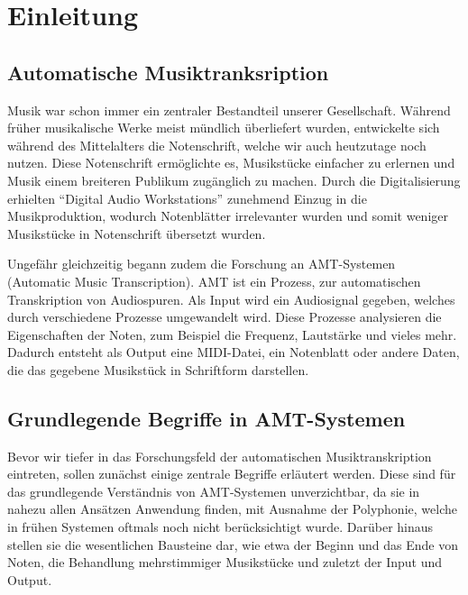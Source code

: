 \section{Einleitung}
\subsection{Automatische Musiktranksription}
Musik war schon immer ein zentraler Bestandteil unserer Gesellschaft.
Während früher musikalische Werke meist mündlich überliefert wurden,
entwickelte sich während des Mittelalters die Notenschrift, welche wir auch heutzutage noch nutzen.
Diese Notenschrift ermöglichte es, Musikstücke einfacher zu erlernen und Musik einem breiteren Publikum zugänglich zu machen.
Durch die Digitalisierung erhielten \enquote{Digital Audio Workstations} zunehmend Einzug in die Musikproduktion,
wodurch Notenblätter irrelevanter wurden und somit weniger Musikstücke in Notenschrift übersetzt wurden.

Ungefähr gleichzeitig begann zudem die Forschung an AMT-Systemen (Automatic Music Transcription).
AMT ist ein Prozess, zur automatischen Transkription von Audiospuren.
Als Input wird ein Audiosignal gegeben, welches durch verschiedene Prozesse umgewandelt wird.
Diese Prozesse analysieren die Eigenschaften der Noten, zum Beispiel die Frequenz, Lautstärke und vieles mehr.
Dadurch entsteht als Output eine MIDI-Datei, ein Notenblatt oder andere Daten,
die das gegebene Musikstück in Schriftform darstellen.

\subsection{Grundlegende Begriffe in AMT-Systemen}
Bevor wir tiefer in das Forschungsfeld der automatischen Musiktranskription eintreten,
sollen zunächst einige zentrale Begriffe erläutert werden.
Diese sind für das grundlegende Verständnis von AMT-Systemen unverzichtbar,
da sie in nahezu allen Ansätzen Anwendung finden, mit Ausnahme der Polyphonie,
welche in frühen Systemen oftmals noch nicht berücksichtigt wurde.
Darüber hinaus stellen sie die wesentlichen Bausteine dar,
wie etwa der Beginn und das Ende von Noten, die Behandlung mehrstimmiger Musikstücke und zuletzt der Input und Output.

